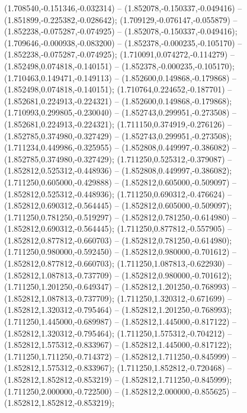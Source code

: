  (1.708540,-0.151346,-0.032314) -- (1.852078,-0.150337,-0.049416) -- (1.851899,-0.225382,-0.028642);
 (1.709129,-0.076147,-0.055879) -- (1.852238,-0.075287,-0.074925) -- (1.852078,-0.150337,-0.049416);
 (1.709646,-0.000938,-0.083200) -- (1.852378,-0.000235,-0.105170) -- (1.852238,-0.075287,-0.074925);
 (1.710091,0.074272,-0.114279) -- (1.852498,0.074818,-0.140151) -- (1.852378,-0.000235,-0.105170);
 (1.710463,0.149471,-0.149113) -- (1.852600,0.149868,-0.179868) -- (1.852498,0.074818,-0.140151);
 (1.710764,0.224652,-0.187701) -- (1.852681,0.224913,-0.224321) -- (1.852600,0.149868,-0.179868);
 (1.710993,0.299805,-0.230040) -- (1.852743,0.299951,-0.273508) -- (1.852681,0.224913,-0.224321);
 (1.711150,0.374919,-0.276126) -- (1.852785,0.374980,-0.327429) -- (1.852743,0.299951,-0.273508);
 (1.711234,0.449986,-0.325955) -- (1.852808,0.449997,-0.386082) -- (1.852785,0.374980,-0.327429);
 (1.711250,0.525312,-0.379087) -- (1.852812,0.525312,-0.448936) -- (1.852808,0.449997,-0.386082);
 (1.711250,0.605000,-0.429888) -- (1.852812,0.605000,-0.509097) -- (1.852812,0.525312,-0.448936);
 (1.711250,0.690312,-0.476624) -- (1.852812,0.690312,-0.564445) -- (1.852812,0.605000,-0.509097);
 (1.711250,0.781250,-0.519297) -- (1.852812,0.781250,-0.614980) -- (1.852812,0.690312,-0.564445);
 (1.711250,0.877812,-0.557905) -- (1.852812,0.877812,-0.660703) -- (1.852812,0.781250,-0.614980);
 (1.711250,0.980000,-0.592450) -- (1.852812,0.980000,-0.701612) -- (1.852812,0.877812,-0.660703);
 (1.711250,1.087813,-0.622930) -- (1.852812,1.087813,-0.737709) -- (1.852812,0.980000,-0.701612);
 (1.711250,1.201250,-0.649347) -- (1.852812,1.201250,-0.768993) -- (1.852812,1.087813,-0.737709);
 (1.711250,1.320312,-0.671699) -- (1.852812,1.320312,-0.795464) -- (1.852812,1.201250,-0.768993);
 (1.711250,1.445000,-0.689987) -- (1.852812,1.445000,-0.817122) -- (1.852812,1.320312,-0.795464);
 (1.711250,1.575312,-0.704212) -- (1.852812,1.575312,-0.833967) -- (1.852812,1.445000,-0.817122);
 (1.711250,1.711250,-0.714372) -- (1.852812,1.711250,-0.845999) -- (1.852812,1.575312,-0.833967);
 (1.711250,1.852812,-0.720468) -- (1.852812,1.852812,-0.853219) -- (1.852812,1.711250,-0.845999);
 (1.711250,2.000000,-0.722500) -- (1.852812,2.000000,-0.855625) -- (1.852812,1.852812,-0.853219);
